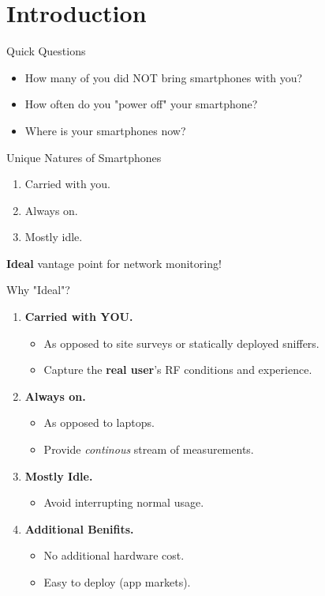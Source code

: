 \section{Introduction}

\begin{frame}{Quick Questions}
  \large
  \begin{itemize}
    \item How many of you did NOT bring smartphones with you?
    \item How often do you "power off" your smartphone?
    \item Where is your smartphones now?
  \end{itemize}
  \begin{block}{Unique Natures of Smartphones}
    \begin{enumerate}
      \item Carried with you.
      \item Always on.
      \item Mostly idle.
    \end{enumerate}
  \end{block}
  \vspace*{5mm}
  \LARGE \textbf{Ideal} vantage point for network monitoring!
\end{frame}

\begin{frame}{Why "Ideal"?}
  \Large
  \begin{enumerate}
    \item \textbf{Carried with YOU.}
      \begin{itemize}
        \item As opposed to site surveys or statically deployed sniffers.
        \item Capture the \textbf{real user}'s RF conditions and experience.
      \end{itemize}
    \item \textbf{Always on.}
      \begin{itemize}
        \item As opposed to laptops.
        \item Provide \textit{continous} stream of measurements.
      \end{itemize}
    \item \textbf{Mostly Idle.}
      \begin{itemize}
        \item Avoid interrupting normal usage.
      \end{itemize}
    \item \textbf{Additional Benifits.}
      \begin{itemize}
        \item No additional hardware cost.
        \item Easy to deploy (app markets).
      \end{itemize}
  \end{enumerate}
\end{frame}

